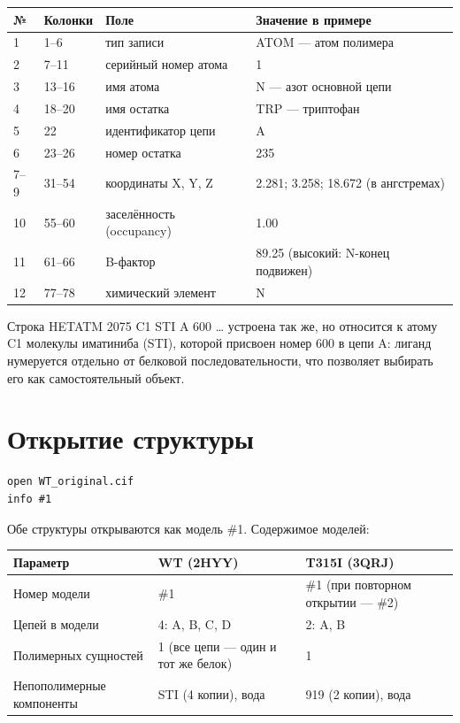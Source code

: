 \documentclass[12pt,a4paper]{article}
\newcommand{\code}[1]{{\ttfamily #1}}
\begin{document}
\begin{center}
\begin{tabular}{L{0.8cm}L{3.0cm}L{3.0cm}L{7.2cm}}
\toprule
\textbf{№} & \textbf{Колонки} & \textbf{Поле} & \textbf{Значение в примере} \\
 & 1--6 & тип записи & \code{ATOM} --- атом полимера \\
2 & 7--11 & серийный номер атома & 1 \\
3 & 13--16 & имя атома & \code{N} --- азот основной цепи \\
4 & 18--20 & имя остатка & \code{TRP} --- триптофан \\
5 & 22 & идентификатор цепи & \code{A} \\
6 & 23--26 & номер остатка & 235 \\
7--9 & 31--54 & координаты X, Y, Z & 2.281; 3.258; 18.672 (в ангстремах) \\
10 & 55--60 & заселённость (occupancy) & 1.00 \\
11 & 61--66 & B-фактор & 89.25 (высокий: N-конец подвижен) \\
12 & 77--78 & химический элемент & \code{N} \\
\bottomrule
\end{tabular}
\end{center}

\noindent Строка \code{HETATM 2075  C1  STI A 600 \ldots} устроена так же, но относится
к атому \code{C1} молекулы иматиниба (\code{STI}), которой присвоен номер 600 в цепи
\code{A}: лиганд нумеруется отдельно от белковой последовательности, что позволяет
выбирать его как самостоятельный объект.

\section{Открытие структуры}

\begin{verbatim}
open WT_original.cif
info #1
\end{verbatim}

\noindent Обе структуры открываются как модель \code{\#1}. Содержимое моделей:

\begin{center}
\begin{tabular}{L{3.4cm}L{5.4cm}L{5.4cm}}
\toprule
\textbf{Параметр} & \textbf{WT (2HYY)} & \textbf{T315I (3QRJ)} \\
\midrule
Номер модели & \#1 & \#1 (при повторном открытии --- \#2) \\
Цепей в модели & 4: A, B, C, D & 2: A, B \\
Полимерных сущностей & 1 (все цепи --- один и тот же белок) & 1 \\
Непополимерные компоненты & STI (4 копии), вода & 919 (2 копии), вода \\
\bottomrule
\end{tabular}
\end{center}
\end{document}
